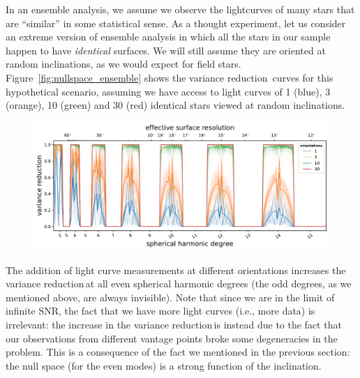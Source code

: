 \documentclass[modern,linenumbers]{aastex62}
\newcommand{\shrinkage}{{variance reduction\,}}
\begin{document}
In an ensemble analysis, we assume we observe the lightcurves of many stars
that are ``similar'' in some statistical sense. As a thought experiment,
let us consider an extreme version of ensemble analysis in which all the
stars in our sample happen to have \emph{identical} surfaces. We will
still assume they are oriented at random inclinations, as we would expect for
field stars.
%
Figure~\ref{fig:nullspace_ensemble} shows the \shrinkage
curves for this hypothetical scenario, assuming we have access to
light curves of 1 (blue), 3 (orange), 10 (green) and 30 (red)
identical stars viewed at random inclinations.

\begin{figure}[t!]
    \begin{centering}
        \includegraphics[width=\linewidth]{figures/nullspace_ensemble.pdf}
    \end{centering}
\end{figure}

The addition of light curve measurements at different orientations
increases the \shrinkage at all even spherical harmonic degrees
(the odd degrees, as we mentioned above, are always invisible).
Note that since we are in the limit of infinite SNR, the fact that we have
more light curves (i.e., more data) is irrelevant: the
increase in the \shrinkage is instead due to the fact that our observations
from different vantage points broke some degeneracies in the problem.
This is a consequence of the fact we mentioned in the previous section:
the null space (for the even modes)
is a strong function of the inclination.
\end{document}
